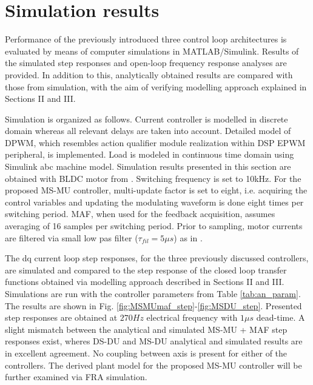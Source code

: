 \documentclass[journal]{IEEEtran}
\begin{document}
\section{Simulation results}
Performance of the previously introduced three control loop architectures is evaluated by means of computer simulations in MATLAB/Simulink. Results of the simulated step responses and open-loop frequency response analyses are provided. In addition to this, analytically obtained results are compared with those from simulation, with the aim of verifying modelling approach explained in Sections II and III. \par
Simulation is organized as follows. Current controller is modelled in discrete domain whereas all relevant delays are taken into account. Detailed model of DPWM, which resembles action qualifier module realization within DSP EPWM peripheral, is implemented. Load is modeled in continuous time domain using Simulink abc machine model. Simulation results presented in this section are obtained with BLDC motor from \cite{vuksa2016}. Switching frequency is set to 10kHz. For the proposed MS-MU controller, multi-update factor is set to eight, i.e. acquiring the control variables and updating the modulating waveform is done eight times per switching period. MAF, when used for the feedback acquisition, assumes averaging of 16 samples per switching period. Prior to sampling, motor currents are filtered via small low pas filter ($\tau_{fil} = 5 \mu s$) as in \cite{vuksa2016}. \par
The dq current loop step responses, for the three previously discussed controllers, are simulated and compared to the step response of the closed loop transfer functions obtained via modelling approach described in Sections II and III. Simulations are run with the controller parameters from Table \ref{tab:an_param}. The results are shown in Fig. \ref{fig:MSMUmaf_step}-\ref{fig:MSDU_step}. Presented step responses are obtained at $270 Hz$ electrical frequency with $1 \mu s$ dead-time. A slight mismatch between the analytical and simulated MS-MU + MAF step responses exist, wheres DS-DU and MS-DU analytical and simulated results are in excellent agreement. No coupling between axis is present for either of the controllers. The derived plant model for the proposed MS-MU controller will be further examined via FRA simulation. \par
\end{document}
